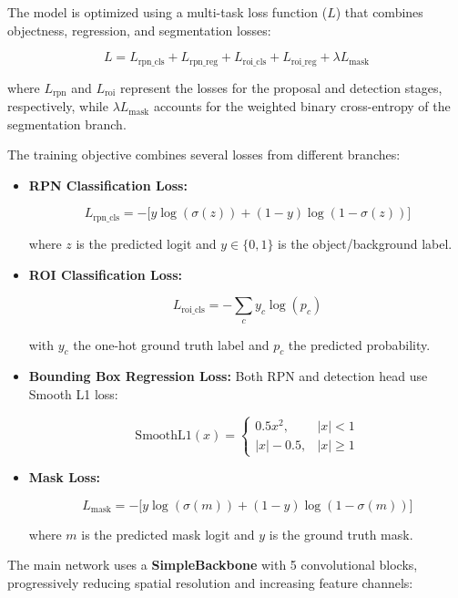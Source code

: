 \documentclass[conference]{IEEEtran}
\begin{document}
The model is optimized using a multi-task loss function ($L$) that combines objectness, regression, and segmentation losses:

\begin{equation}
L = L_{\text{rpn\_cls}} + L_{\text{rpn\_reg}} + L_{\text{roi\_cls}} + L_{\text{roi\_reg}} + \lambda L_{\text{mask}}
\end{equation}


where $L_{\text{rpn}}$ and $L_{\text{roi}}$ represent the losses for the proposal and detection stages, respectively, while $\lambda L_{\text{mask}}$ accounts for the weighted binary cross-entropy of the segmentation branch.


The training objective combines several losses from different branches:

\begin{itemize}
    \item \textbf{RPN Classification Loss:}
    

\[
    L_{\text{rpn\_cls}} = -\big[y \log(\sigma(z)) + (1-y)\log(1-\sigma(z))\big]
    \]


    where $z$ is the predicted logit and $y \in \{0,1\}$ is the object/background label.

    \item \textbf{ROI Classification Loss:}
    

\[
    L_{\text{roi\_cls}} = -\sum_{c} y_c \log(p_c)
    \]


    with $y_c$ the one-hot ground truth label and $p_c$ the predicted probability.

    \item \textbf{Bounding Box Regression Loss:}  
    Both RPN and detection head use Smooth L1 loss:
    

\[
    \text{SmoothL1}(x) =
    \begin{cases}
    0.5x^2, & |x| < 1 \\
    |x| - 0.5, & |x| \geq 1
    \end{cases}
    \]



    \item \textbf{Mask Loss:}
    

\[
    L_{\text{mask}} = -\big[y \log(\sigma(m)) + (1-y)\log(1-\sigma(m))\big]
    \]


    where $m$ is the predicted mask logit and $y$ is the ground truth mask.
\end{itemize}

The main network uses a \textbf{SimpleBackbone} with 5 convolutional blocks, progressively reducing spatial resolution and increasing feature channels:
\end{document}
